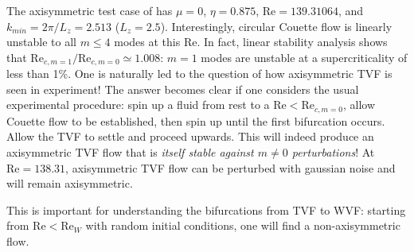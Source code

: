 \documentclass[openacc]{rstransa}%
\newcommand{\Reyn}{\mathrm{Re}}
\newcommand{\Lop}{\mathcal{L}}
\begin{document}
The axisymmetric test case of \cite{1984JFM...146...65M} has $\mu = 0$, $\eta = 0.875$, $\Reyn = 139.31064$, and $k_{min} = 2\pi/L_z = 2.513$ ($L_z = 2.5$). Interestingly, circular Couette flow is linearly unstable to all $m \leq 4$ modes at this $\Reyn$. 
In fact, linear stability analysis shows that $\Reyn_{c,m=1}/\Reyn_{c, m=0} \simeq 1.008$: $m=1$ modes are unstable at a supercriticality of less than 1\%. 
One is naturally led to the question of how axisymmetric TVF is seen in experiment!
The answer becomes clear if one considers the usual experimental procedure: spin up a fluid from rest to a $\Reyn < \Reyn_{c,m=0}$, allow Couette flow to be established, then spin up until the first bifurcation occurs. Allow the TVF to settle and proceed upwards. This will indeed produce an axisymmetric TVF flow that is \emph{itself stable against $m\ne 0$ perturbations}! At $\Reyn = 138.31$, axisymmetric TVF flow can be perturbed with gaussian noise and will remain axisymmetric. 

This is important for understanding the bifurcations from TVF to WVF: starting from $\Reyn < \Reyn_{W}$ with random initial conditions, one will find a non-axisymmetric flow.

\end{document}
